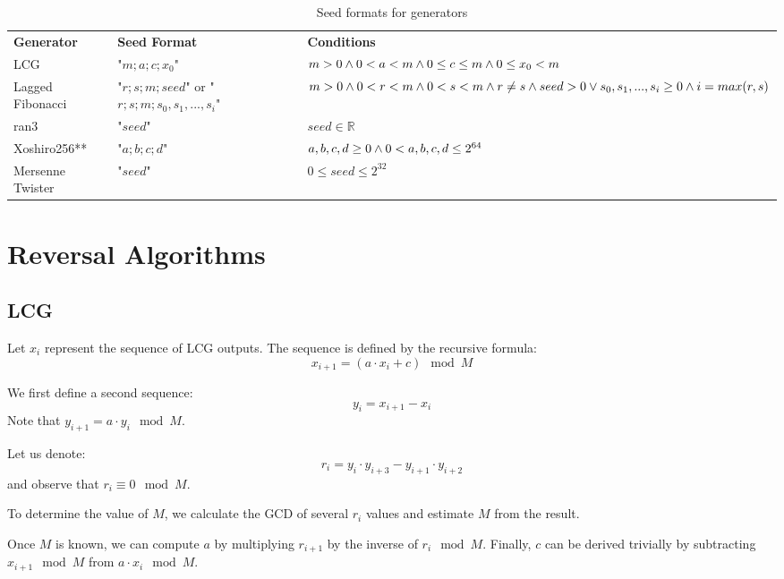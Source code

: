 \documentclass[12pt, a4paper]{report}
\begin{document}
\begin{table}
\begin{xltabular}{\textwidth}{| >{\raggedright\arraybackslash}X | >{\raggedright\arraybackslash}X | >{\raggedright\arraybackslash}X |}
	\caption{Seed formats for generators}
	\label{table:1}\\
	\hline
	\bf{Generator} & \bf{Seed Format} & \bf{Conditions} \\
	\hhline{|=|=|=|}
	LCG & 
	"$m;a;c;x_0$" & 
	$m > 0 \wedge\break 0 < a < m \wedge\break 0\leq c \leq m \wedge\break 0 \leq x_0 < m$\\
	\hline
	Lagged Fibonacci & 
	"$r;s;m;seed$" or \break "$r;s;m;s_0, s_1, ..., s_i$" & 
	$m > 0 \wedge\break 0 < r < m \wedge\break 0 < s < m \wedge\break r \neq s \wedge\break\break seed > 0 \vee\break
	s_0, s_1, ..., s_i \geq 0 \wedge\break i = max(r, s)$\\
	\hline
	ran3 &
	"$seed$" & 
  $seed \in \mathds{R}$\\
	\hline
	Xoshiro256** &
	"$a;b;c;d$" & 
	$a,b,c,d \ge 0 \wedge\break 0 < a,b,c,d \leq 2^{64}$ \\
	\hline
	Mersenne Twister&
	"$seed$" &
	$0 \leq seed \leq 2^{32}$ \\
	\hline
\end{xltabular}
\end{table}

\chapter{Reversal Algorithms}
\section{LCG}
Let $x_i$ represent the sequence of LCG outputs. The sequence is defined by the recursive formula:
$$x_{i+1} = (a \cdot x_i + c) \mod M$$

We first define a second sequence:
$$y_{i} = x_{i+1} - x_{i}$$ 
Note that $y_{i+1} = a \cdot y_{i} \mod M$.

Let us denote:
$$r_i = y_{i} \cdot y_{i+3} - y_{i+1} \cdot y_{i+2}$$
and observe that $r_i \equiv 0 \mod M$.

To determine the value of $M$, we calculate the GCD of several $r_i$ values and estimate $M$ from the result.

Once $M$ is known, we can compute $a$ by multiplying $r_{i+1}$ by the inverse of $r_{i} \mod M$.
Finally, $c$ can be derived trivially by subtracting $x_{i+1} \mod M$ from $a
\cdot x_{i} \mod M$.
\end{document}
